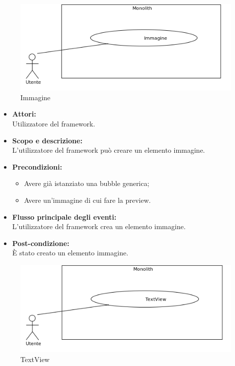 \pagebreak


\begin{figure}[H]
	\centering
	\includegraphics[width=15cm]{../../documenti/AnalisiDeiRequisiti/Diagrammi_img/uc1_25.png}
	\caption{\UCFFCaption{} Immagine}
\end{figure}

\begin{itemize}
	\item \textbf{Attori:}
	\\Utilizzatore del framework.
	\item \textbf{Scopo e descrizione:} 
	\\L'utilizzatore del framework può creare un elemento immagine.
	\item \textbf{Precondizioni:}
	\begin{itemize}
		\item Avere già istanziato una bubble generica;
		\item Avere un'immagine di cui fare la preview.
	\end{itemize}
	\item \textbf{Flusso principale degli eventi:}
	\\L'utilizzatore del framework crea un elemento immagine.
	\item \textbf{Post-condizione:}
	\\È stato creato un elemento immagine.
\end{itemize}

\pagebreak


\begin{figure}[H]
	\centering
	\includegraphics[width=15cm]{../../documenti/AnalisiDeiRequisiti/Diagrammi_img/uc1_26.png}
	\caption{\UCFFCaption{} TextView}
\end{figure}

